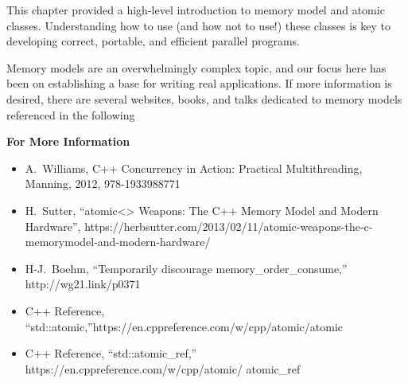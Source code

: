 
This chapter provided a high-level introduction to memory model and atomic classes. Understanding how to use (and how not to use!) these classes is key to developing correct, portable, and efficient parallel programs.\par

Memory models are an overwhelmingly complex topic, and our focus here has been on establishing a base for writing real applications. If more information is desired, there are several websites, books, and talks dedicated to memory models referenced in the following\par

\hspace*{\fill} \par %
\textbf{For More Information}

\begin{itemize}
	\item A. Williams, C++ Concurrency in Action: Practical 	Multithreading, Manning, 2012, 978-1933988771

	\item H. Sutter, “atomic<> Weapons: The C++ Memory Model and Modern Hardware”, https://herbsutter.com/2013/02/11/atomic-weapons-the-c-memorymodel-and-modern-hardware/
	\item H-J. Boehm, “Temporarily discourage memory\_order\_consume,” http://wg21.link/p0371
	\item C++ Reference,\\ “std::atomic,”https://en.cppreference.com/w/cpp/atomic/atomic
	\item C++ Reference, “std::atomic\_ref,” \\
	https://en.cppreference.com/w/cpp/atomic/
	atomic\_ref
\end{itemize}

\newpage